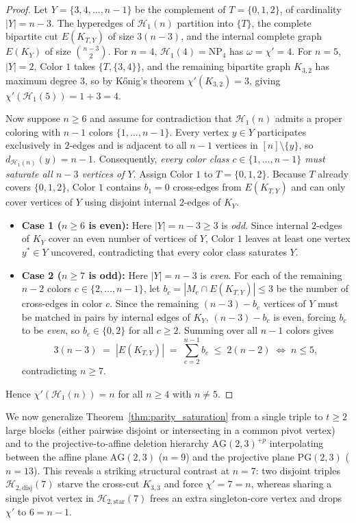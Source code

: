 \documentclass[11pt,reqno]{amsart}
\theoremstyle{definition}
\theoremstyle{remark}
\begin{document}
\begin{proof}
Let $Y = \{3, 4, \dots, n - 1\}$ be the complement of $T = \{0, 1, 2\}$, of cardinality $|Y| = n - 3$. The hyperedges of $\mathcal{H}_1(n)$ partition into $\{T\}$, the complete bipartite cut $E(K_{T, Y})$ of size $3(n - 3)$, and the internal complete graph $E(K_Y)$ of size $\binom{n-3}{2}$. For $n = 4$, $\mathcal{H}_1(4) = \mathrm{NP}_4$ has $\omega = \chi' = 4$. For $n = 5$, $|Y| = 2$, Color $1$ takes $\{T, \{3, 4\}\}$, and the remaining bipartite graph $K_{3, 2}$ has maximum degree $3$, so by K\H{o}nig's theorem $\chi'(K_{3,2}) = 3$, giving $\chi'(\mathcal{H}_1(5)) = 1 + 3 = 4$.

Now suppose $n \ge 6$ and assume for contradiction that $\mathcal{H}_1(n)$ admits a proper coloring with $n - 1$ colors $\{1, \dots, n - 1\}$. Every vertex $y \in Y$ participates exclusively in $2$-edges and is adjacent to all $n - 1$ vertices in $[n] \setminus \{y\}$, so $d_{\mathcal{H}_1(n)}(y) = n - 1$. Consequently, \emph{every color class $c \in \{1, \dots, n - 1\}$ must saturate all $n - 3$ vertices of $Y$}. Assign Color $1$ to $T = \{0, 1, 2\}$. Because $T$ already covers $\{0, 1, 2\}$, Color $1$ contains $b_1 = 0$ cross-edges from $E(K_{T, Y})$ and can only cover vertices of $Y$ using disjoint internal $2$-edges of $K_Y$.
\begin{itemize}
  \item \textbf{Case 1 ($n \ge 6$ is even):} Here $|Y| = n - 3 \ge 3$ is \emph{odd}. Since internal $2$-edges of $K_Y$ cover an even number of vertices of $Y$, Color $1$ leaves at least one vertex $y^* \in Y$ uncovered, contradicting that every color class saturates $Y$.
  \item \textbf{Case 2 ($n \ge 7$ is odd):} Here $|Y| = n - 3$ is \emph{even}. For each of the remaining $n - 2$ colors $c \in \{2, \dots, n - 1\}$, let $b_c = |M_c \cap E(K_{T, Y})| \le 3$ be the number of cross-edges in color $c$. Since the remaining $(n - 3) - b_c$ vertices of $Y$ must be matched in pairs by internal edges of $K_Y$, $(n - 3) - b_c$ is even, forcing $b_c$ to be \emph{even}, so $b_c \in \{0, 2\}$ for all $c \ge 2$. Summing over all $n - 1$ colors gives
  \[
    3(n - 3) \;=\; |E(K_{T, Y})| \;=\; \sum_{c=2}^{n-1} b_c \;\le\; 2(n - 2) \;\Longleftrightarrow\; n \le 5,
  \]
  contradicting $n \ge 7$.
\end{itemize}
Hence $\chi'(\mathcal{H}_1(n)) = n$ for all $n \ge 4$ with $n \ne 5$.
\end{proof}

We now generalize Theorem~\ref{thm:parity_saturation} from a single triple to $t \ge 2$ large blocks (either pairwise disjoint or intersecting in a common pivot vertex) and to the projective-to-affine deletion hierarchy $\mathrm{AG}(2,3)^{+p}$ interpolating between the affine plane $\mathrm{AG}(2,3)$ ($n = 9$) and the projective plane $\mathrm{PG}(2,3)$ ($n = 13$). This reveals a striking structural contrast at $n = 7$: two disjoint triples $\mathcal{H}_{2,\mathrm{disj}}(7)$ starve the cross-cut $K_{3,3}$ and force $\chi' = 7 = n$, whereas sharing a single pivot vertex in $\mathcal{H}_{2,\mathrm{star}}(7)$ frees an extra singleton-core vertex and drops $\chi'$ to $6 = n - 1$.
\end{document}
